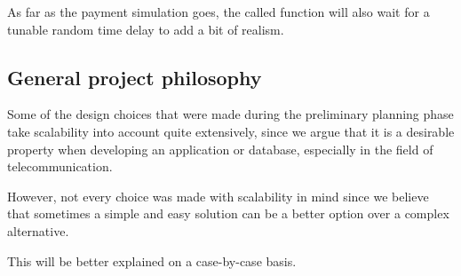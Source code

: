 As far as the payment simulation goes, the called function will also wait for a tunable random time delay to add a bit of realism.

\subsection*{General project philosophy}

Some of the design choices that were made during the preliminary planning phase take scalability into account quite extensively, since we argue that it is a desirable property when developing an application or database, especially in the field of telecommunication.

However, not every choice was made with scalability in mind since we believe that sometimes a simple and easy solution can be a better option over a complex alternative.

This will be better explained on a case-by-case basis.
